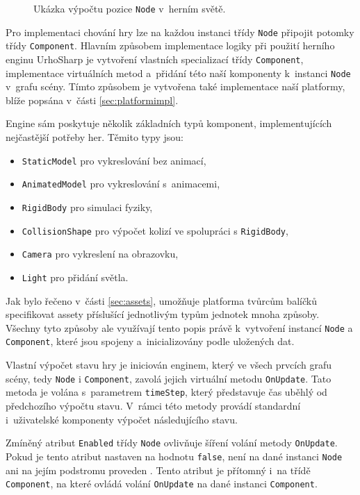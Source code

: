 \begin{figure}[h]
	\centering
	\fontsize{8pt}{11pt}\selectfont
	\def\svgwidth{\textwidth}
	
	\caption{Ukázka výpočtu pozice \texttt{Node} v~herním světě.}
	\label{fig:relativeposition}
\end{figure}

Pro implementaci chování hry lze na každou instanci třídy \texttt{Node} připojit potomky třídy \texttt{Component}. Hlavním způsobem implementace logiky při použití herního enginu UrhoSharp je vytvoření vlastních specializací třídy \texttt{Component}, implementace virtuálních metod a~přidání této naší komponenty k~instanci \texttt{Node} v~grafu scény. Tímto způsobem je vytvořena také implementace naší platformy, blíže popsána v~části \ref{sec:platformimpl}. 

Engine sám poskytuje několik základních typů komponent, implementujících nejčastější potřeby her. Těmito typy jsou:

\begin{itemize}
	\item \texttt{StaticModel} pro vykreslování bez animací,
	\item \texttt{AnimatedModel} pro vykreslování s~animacemi,
	\item \texttt{RigidBody} pro simulaci fyziky,
	\item \texttt{CollisionShape} pro výpočet kolizí ve spolupráci s \texttt{RigidBody},
	\item \texttt{Camera} pro vykreslení na obrazovku,
	\item \texttt{Light} pro přidání světla.
\end{itemize}

Jak bylo řečeno v~části \ref{sec:assets}, umožňuje platforma tvůrcům balíčků specifikovat assety příslušící jednotlivým typům jednotek mnoha způsoby. Všechny tyto způsoby ale využívají tento popis právě k~vytvoření instancí \texttt{Node} a \texttt{Component}, které jsou spojeny a~inicializovány podle uložených dat. 

Vlastní výpočet stavu hry je iniciován enginem, který ve všech prvcích grafu scény, tedy \texttt{Node} i \texttt{Component}, zavolá jejich virtuální metodu \texttt{OnUpdate}. Tato metoda je volána s~parametrem \texttt{timeStep}, který představuje čas uběhlý od předchozího výpočtu stavu. V~rámci této metody provádí standardní i~uživatelské komponenty výpočet následujícího stavu.

Zmíněný atribut \texttt{Enabled} třídy \texttt{Node} ovlivňuje šíření volání metody \texttt{OnUpdate}. Pokud je tento atribut nastaven na hodnotu \texttt{false}, není na dané instanci \texttt{Node} ani na jejím podstromu proveden . Tento atribut je přítomný i~na třídě \texttt{Component}, na které ovládá volání \texttt{OnUpdate} na dané instanci \texttt{Component}.

